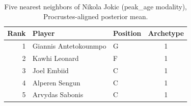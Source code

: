 \begin{table}[htbp]
  \centering\small
  \begin{tabular}{rllc}
    \toprule
    Rank & Player & Position & Archetype \\
    \midrule
    1 & Giannis Antetokounmpo & G & 1 \\
    2 & Kawhi Leonard & F & 1 \\
    3 & Joel Embiid & C & 1 \\
    4 & Alperen Sengun & C & 1 \\
    5 & Arvydas Sabonis & C & 1 \\
    \bottomrule
  \end{tabular}
  \caption{Five nearest neighbors of Nikola Jokic (peak_age modality), Procrustes-aligned posterior mean.}
  \label{tab:Nikola_Jokic_neighbors_peak_age}
\end{table}

